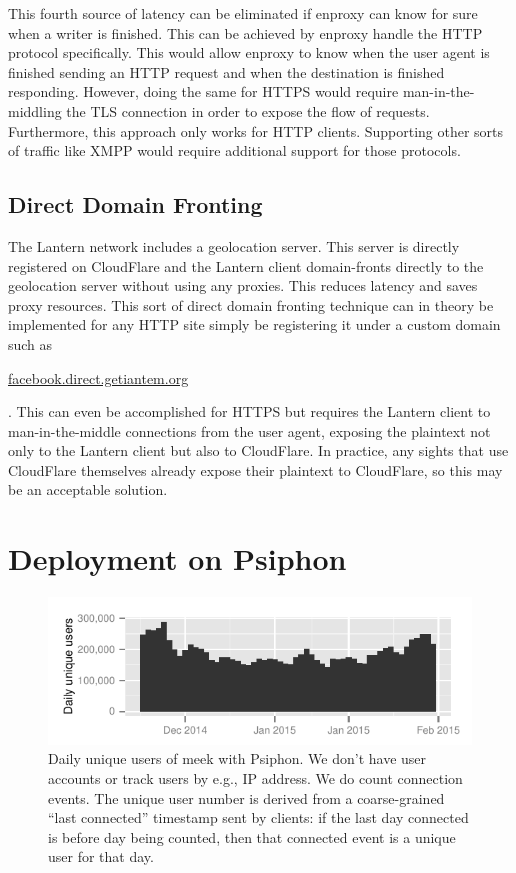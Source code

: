 \documentclass{sig-alternate}
\newcommand{\meek}{meek\xspace}
\def\urll#1{\begin{NoHyper}\url{#1}\end{NoHyper}}
\begin{document}
This fourth source of latency can be eliminated if enproxy can know for
sure when a writer is finished. This can be achieved by enproxy handle the HTTP
protocol specifically. This would allow enproxy to know when the user agent is
finished sending an HTTP request and when the destination is finished
responding. However, doing the same for HTTPS would require man-in-the-middling
the TLS connection in order to expose the flow of requests. Furthermore, this
approach only works for HTTP clients. Supporting other sorts of traffic like
XMPP would require additional support for those protocols.

\subsection{Direct Domain Fronting}
The Lantern network includes a geolocation server. This server is directly
registered on CloudFlare and the Lantern client domain-fronts directly to the
geolocation server without using any proxies. This reduces latency and saves
proxy resources. This sort of direct domain fronting technique can in theory be
implemented for any HTTP site simply be registering it under a custom domain
such as \urll{facebook.direct.getiantem.org}. This can even be accomplished for
HTTPS but requires the Lantern client to man-in-the-middle connections from the
user agent, exposing the plaintext not only to the Lantern client but also to
CloudFlare. In practice, any sights that use CloudFlare themselves already
expose their plaintext to CloudFlare, so this may be an acceptable solution.


\section{Deployment on Psiphon}
\label{sec:deploy-psiphon}

\begin{figure}
\includegraphics[width=\linewidth]{clients-psiphon}
\caption{
Daily unique users of \meek with
Psiphon.
We don't have user accounts or track users by e.g., IP address. We do
count connection events. The unique user number is derived from a
coarse-grained ``last connected'' timestamp sent by clients: if the last day
connected is before day being counted, then that connected event is a
unique user for that day.
}
\label{fig:clients-psiphon}
\end{figure}
\end{document}

